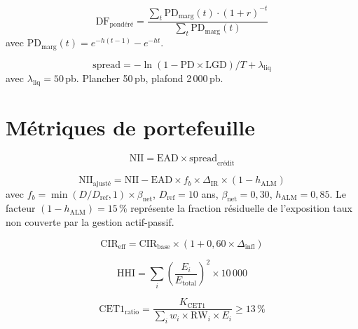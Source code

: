 \documentclass[10pt, a4paper, oneside]{report}
\theoremstyle{definition}
\begin{document}
\begin{equation}
\text{DF}_{\text{pondéré}} = \frac{\sum_t \text{PD}_{\text{marg}}(t) \cdot (1+r)^{-t}}{\sum_t \text{PD}_{\text{marg}}(t)}
\label{eq:df-weighted}
\end{equation}
avec $\text{PD}_{\text{marg}}(t) = e^{-h(t-1)} - e^{-ht}$.

\begin{equation}
\text{spread} = -\ln(1 - \text{PD} \times \text{LGD}) / T + \lambda_{\text{liq}}
\label{eq:spread}
\end{equation}
avec $\lambda_{\text{liq}} = 50$\,pb. Plancher 50\,pb, plafond 2\,000\,pb.


\section{Métriques de portefeuille}
\label{sec:annexe:metriques}

\begin{equation}
\text{NII} = \text{EAD} \times \text{spread}_{\text{crédit}}
\label{eq:nii}
\end{equation}

\begin{equation}
\text{NII}_{\text{ajusté}} = \text{NII} - \text{EAD} \times f_b \times \Delta_{\text{IR}} \times (1 - h_{\text{ALM}})
\label{eq:nii-alm}
\end{equation}
avec $f_b = \min(D / D_{\text{ref}}, 1) \times \beta_{\text{net}}$, $D_{\text{ref}} = 10$ ans, $\beta_{\text{net}} = 0{,}30$, $h_{\text{ALM}} = 0{,}85$. Le facteur $(1 - h_{\text{ALM}}) = 15\,\%$ représente la fraction résiduelle de l'exposition taux non couverte par la gestion actif-passif.

\begin{equation}
\text{CIR}_{\text{eff}} = \text{CIR}_{\text{base}} \times (1 + 0{,}60 \times \Delta_{\text{infl}})
\label{eq:cir-infl}
\end{equation}

\begin{equation}
\text{HHI} = \sum_{i} \left(\frac{E_i}{E_{\text{total}}}\right)^2 \times 10\,000
\label{eq:hhi}
\end{equation}

\begin{equation}
\text{CET1}_{\text{ratio}} = \frac{K_{\text{CET1}}}{\sum_i w_i \times \text{RW}_i \times E_i} \geq 13\,\%
\label{eq:cet1}
\end{equation}
\end{document}
